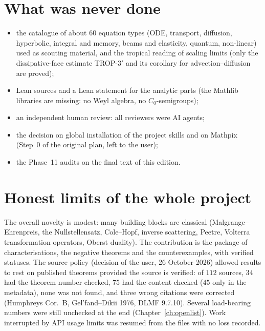 \section{What was never done}

\begin{itemize}
\item the catalogue of about $60$ equation types (ODE, transport, diffusion, hyperbolic, integral and memory, beams and elasticity, quantum, non-linear) used as scouting material, and the tropical reading of scaling limits (only the dissipative-face estimate TROP-3$'$ and its corollary for advection--diffusion are proved);
\item Lean sources and a Lean statement for the analytic parts (the Mathlib libraries are missing: no Weyl algebra, no $C_0$-semigroups);
\item an independent human review: all reviewers were AI agents;
\item the decision on global installation of the project skills and on Mathpix (Step~0 of the original plan, left to the user);
\item the Phase~11 audits on the final text of this edition.
\end{itemize}

\section{Honest limits of the whole project}

The overall novelty is modest: many building blocks are classical (Malgrange--Ehrenpreis, the Nullstellensatz, Cole--Hopf, inverse scattering, Peetre, Volterra transformation operators, Oberst duality). The contribution is the package of characterisations, the negative theorems and the counterexamples, with verified statuses. The source policy (decision of the user, 26 October 2026) allowed results to rest on published theorems provided the source is verified: of $112$ sources, $34$ had the theorem number checked, $75$ had the content checked ($45$ only in the metadata), none was not found, and three wrong citations were corrected (Humphreys Cor.~B, Gel'fand--Dikii 1976, DLMF 9.7.10). Several load-bearing numbers were still unchecked at the end (Chapter~\ref{ch:openlist}). Work interrupted by API usage limits was resumed from the files with no loss recorded.
